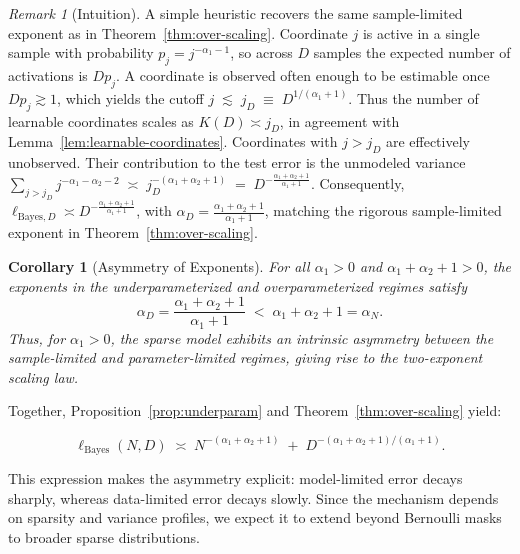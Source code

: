 \documentclass[11pt]{article}
\theoremstyle{plain}
\newtheorem{corollary}[theorem]{Corollary}
\theoremstyle{definition}
\theoremstyle{remark}
\newtheorem{remark}[theorem]{Remark}
\newcommand{\JSCheck}[1]{#1}
\begin{document}
\begin{remark}[Intuition]
A simple heuristic recovers the same sample-limited exponent as in 
Theorem~\ref{thm:over-scaling}. Coordinate $j$ is active in a single sample  with probability $p_j = j^{-\alpha_1 - 1}$, so across $D$ samples the expected  number of activations is $D p_j$. A coordinate is observed often enough to be estimable once $D p_j \gtrsim 1$, which yields the cutoff $j \;\lesssim\; j_D \;\equiv\; D^{1/(\alpha_1+1)}$. Thus the number of learnable coordinates scales as  $K(D) \asymp j_D$, in agreement with  Lemma~\ref{lem:learnable-coordinates}. Coordinates with $j > j_D$ are effectively unobserved. Their contribution to the test error is the unmodeled variance $\sum_{j>j_D} j^{-\alpha_1 - \alpha_2 - 2} \;\asymp\; j_D^{-(\alpha_1+\alpha_2+1)} \;=\; D^{-\frac{\alpha_1+\alpha_2+1}{\alpha_1+1}}$. \JSCheck{Consequently, \(\ell_{\mathrm{Bayes},D} \asymp D^{-\frac{\alpha_1+\alpha_2+1}{\alpha_1+1}}\),} with $\alpha_D = \frac{\alpha_1+\alpha_2+1}{\alpha_1+1}$, matching the rigorous sample-limited exponent in  Theorem~\ref{thm:over-scaling}.
\end{remark}



\begin{corollary}[Asymmetry of Exponents]
\label{cor:asymmetry}
For all \(\alpha_1 > 0\) and \(\alpha_1+\alpha_2+1>0\), the exponents in the underparameterized and overparameterized regimes satisfy
\begin{equation}
\alpha_D
=
\frac{\alpha_1 + \alpha_2 + 1}{\alpha_1 + 1}
\;<\;
\alpha_1 + \alpha_2 + 1
=
\alpha_N.
\end{equation}
Thus,  for $\alpha_1 > 0$, the sparse model  exhibits an intrinsic asymmetry between the sample-limited and parameter-limited regimes, giving rise to the
two-exponent scaling law.
\end{corollary}

Together, Proposition~\ref{prop:underparam} and Theorem~\ref{thm:over-scaling} yield:
\begin{center}
\begin{tcolorbox}[
    colback=white,
    colframe=black,
    boxrule=0.5pt,
    arc=3pt,
    left=2pt,
    right=2pt,
    top=-2pt,
    bottom=4pt,
    width=0.7\columnwidth,
    before skip=0pt,
    after skip=0pt
]
\begin{equation}
\ell_{\mathrm{Bayes}}(N, D)
\;\asymp\;
N^{-(\alpha_1 + \alpha_2 + 1)}
\;+\;
D^{-(\alpha_1 + \alpha_2 + 1)/(\alpha_1 + 1)}.
\label{eq:two-exponent-summary}
\end{equation}
\end{tcolorbox}
\end{center}
\vspace{-1mm}
\noindent
\JSCheck{This expression makes the asymmetry explicit: model-limited error decays sharply, whereas data-limited error decays slowly. Since the mechanism depends on sparsity and variance profiles, we expect it to extend beyond Bernoulli masks to broader sparse distributions.}
\end{document}
